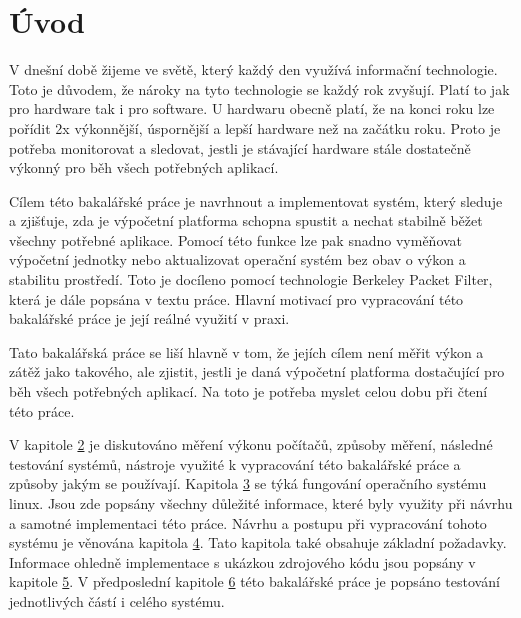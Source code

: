 \chapter{Úvod}

V dnešní době žijeme ve světě, který každý den využívá informační technologie. Toto je důvodem, že nároky na tyto technologie se
každý rok zvyšují. Platí to jak pro hardware tak i pro software. U hardwaru obecně platí, že na konci roku lze pořídit 2x výkonnější,
úspornější a lepší hardware než na začátku roku. Proto je potřeba monitorovat a sledovat, jestli je stávající hardware stále
dostatečně výkonný pro běh všech potřebných aplikací.

Cílem této bakalářské práce je navrhnout a implementovat systém, který sleduje a zjišťuje, zda je výpočetní platforma schopna spustit a nechat stabilně běžet
všechny potřebné aplikace. Pomocí této funkce lze pak snadno vyměňovat výpočetní jednotky
nebo aktualizovat operační systém bez obav o výkon a stabilitu prostředí. 
Toto je docíleno pomocí technologie Berkeley Packet Filter, která je dále popsána v textu práce. Hlavní motivací pro vypracování této bakalářské práce je její reálné využití v praxi. 

\iffalse
Na trhu neni nic podobneho nejak to napsat
\fi

Tato bakalářská práce se liší hlavně v tom, že jejích cílem není měřit výkon a zátěž jako takového, ale zjistit, jestli je daná výpočetní platforma dostačující pro běh všech potřebných aplikací. Na toto je potřeba myslet celou dobu při čtení této práce.

V kapitole \hyperref[sec:RozborReseneProblematiky]{2} je diskutováno měření výkonu počítačů, způsoby měření, následné testování systémů, nástroje využité k vypracování této bakalářské práce a způsoby jakým se používají. Kapitola \hyperref[sec:FungovaniOperacnihoSystemuLinux]{3} se týká fungování operačního systému linux. Jsou zde popsány všechny důležité informace, které byly využity při návrhu a samotné implementaci této práce. Návrhu a postupu při vypracování tohoto systému je věnována kapitola \hyperref[sec:NavrhSystemu]{4}. Tato kapitola také obsahuje základní požadavky. Informace ohledně implementace s ukázkou zdrojového kódu jsou popsány v kapitole \hyperref[sec:ImplementaceSystemu]{5}. V předposlední kapitole \hyperref[sec:Testovani]{6} této bakalářské práce je popsáno testování jednotlivých částí i celého systému.


\iffalse
uvod:
proc tam ktera cast je, motivace, proc to delam, limit soucasneho sveta a o co se snazim ja
uvod napsat tam nejaky priklad ... autonomni rizeni
potreba optimalizovat vykon primo na miste
zamyslet se nad strukturou uvodu
\fi
